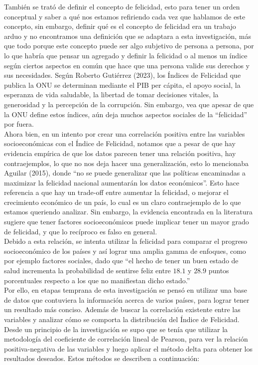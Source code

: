 También se trató de definir el concepto de felicidad, esto para tener un orden conceptual y saber a qué nos estamos refiriendo cada vez que hablamos de este concepto, sin embargo, definir qué es el concepto de felicidad era un trabajo arduo y no encontramos una definición que se adaptara a esta investigación, más que todo porque este concepto puede ser algo subjetivo de persona a persona, por lo que habría que pensar un agregado y definir la felicidad o al menos un índice según ciertos aspectos en común que hace que una persona valide sus derechos y sus necesidades. Según Roberto Gutiérrez (2023), los Índices de Felicidad que publica la ONU se determinan mediante el PIB per cápita, el apoyo social, la esperanza de vida saludable, la libertad de tomar decisiones vitales, la generosidad y la percepción de la corrupción. Sin embargo, vea que apesar de que la ONU define estos índices, aún deja muchos aspectos sociales de la ``felicidad'' por fuera. \\

Ahora bien, en un intento por crear una correlación positiva entre las variables socioeconómicas con el Índice de Felicidad, notamos que a pesar de que hay evidencia empírica de que los datos parecen tener una relación positiva, hay contraejemplos, lo que no nos deja hacer una generalización, esto lo mencionaba Aguilar (2015), donde ``no se puede generalizar que las políticas encaminadas a maximizar la felicidad nacional aumentarán los datos económicos''. Esto hace referencia a que hay un trade-off entre aumentar la felicidad, o mejorar el crecimiento económico de un país, lo cual es un claro contraejemplo de lo que estamos queriendo analizar. Sin embargo, la evidencia encontrada en la literatura sugiere que tener factores socioeconómicos puede implicar tener un mayor grado de felicidad, y que lo recíproco es falso en general. \\

Debido a esta relación, se intenta utilizar la felicidad para comparar el progreso socioeconómico de los países y así lograr una amplia gamma de enfoques, como por ejemplo factores sociales, dado que ``el hecho de tener un buen estado de salud incrementa la probabilidad de sentirse feliz entre $18.1$ y $28.9$ puntos porcentuales respecto a los que no manifiestan dicho estado.''\\

Por ello, en etapas temprana de esta investigación se pensó en utilizar una base de datos que contuviera la información acerca de varios países, para lograr tener un resultado más conciso. Además de buscar la correlación existente entre las variables y analizar cómo se comporta la distribución del Índice de Felicidad. Desde un principio de la investigación se supo que se tenía que utilizar la metodología del coeficiente de correlación lineal de Pearson, para ver la relación positiva-negativa de las variables y luego aplicar el método delta para obtener los resultados deseados. Estos métodos se describen a continuación: \\

